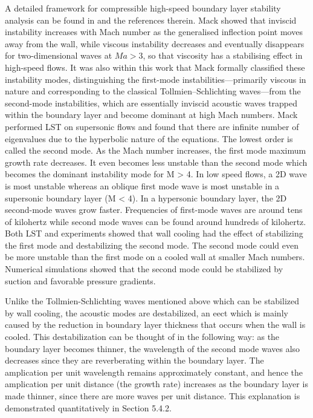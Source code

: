 A detailed framework for compressible high-speed boundary layer stability analysis can be found in \citet{Mack1984} and the references therein. Mack showed that inviscid instability increases with Mach number as the generalised inflection point moves away from the wall, while viscous instability decreases and eventually disappears for two-dimensional waves at $Ma > 3$, so that viscosity has a stabilising effect in high-speed flows. It was also within this work that Mack formally classified these instability modes, distinguishing the first-mode instabilities—primarily viscous in nature and corresponding to the classical Tollmien–Schlichting waves—from the second-mode instabilities, which are essentially inviscid acoustic waves trapped within the boundary layer and become dominant at high Mach numbers. Mack performed \gls{LST} on supersonic flows and found that there are infinite number of eigenvalues due to the hyperbolic nature of the equations. The lowest order is called the second mode. As the Mach number increases, the first mode maximum growth
rate decreases. It even becomes less unstable than the second mode which becomes the
dominant instability mode for M > 4. In low speed flows, a 2D wave is most unstable
whereas an oblique first mode wave is most unstable in a supersonic boundary layer (M
< 4). In a hypersonic boundary layer, the 2D second-mode waves grow faster. Frequencies of first-mode waves are around tens of kilohertz while second mode waves can be found around hundreds of kilohertz. Both LST and experiments showed that wall cooling had the effect of stabilizing the first mode and destabilizing the second mode. The second mode could even be more unstable than the first mode on a cooled wall at smaller Mach numbers. Numerical simulations showed that the second mode could be stabilized by suction and favorable pressure gradients.

Unlike the Tollmien-Schlichting waves mentioned above which can be stabilized by
wall cooling, the acoustic modes are destabilized, an eect which is mainly caused by
the reduction in boundary layer thickness that occurs when the wall is cooled. This
destabilization can be thought of in the following way: as the boundary layer becomes
thinner, the wavelength of the second mode waves also decreases since they are reverberating within the boundary layer. The amplication per unit wavelength remains
approximately constant, and hence the amplication per unit distance (the growth
rate) increases as the boundary layer is made thinner, since there are more waves per
unit distance. This explanation is demonstrated quantitatively in Section 5.4.2.

